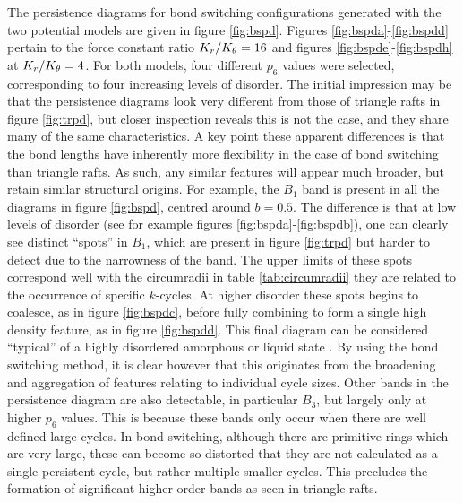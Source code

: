 The persistence diagrams for bond switching configurations generated with the two potential models are given in figure \ref{fig:bspd}.
Figures \ref{fig:bspda}\--\ref{fig:bspdd} pertain to the force constant ratio $K_r/K_\theta=16$ and figures \ref{fig:bspde}\--\ref{fig:bspdh} at $K_r/K_\theta=4$.
For both models, four different $p_6$ values were selected, corresponding to four increasing levels of disorder.
The initial impression may be that the persistence diagrams look very different from those of triangle rafts in figure \ref{fig:trpd}, but closer inspection reveals this is not the case, and they share many of the same characteristics.
A key point these apparent differences is that the bond lengths have inherently more flexibility in the case of bond switching than triangle rafts.
As such, any similar features will appear much broader, but retain similar structural origins.
For example, the $B_1$ band is present in all the diagrams in figure \ref{fig:bspd}, centred around $b=0.5$.
The difference is that at low levels of disorder  (see for example figures \ref{fig:bspda}\--\ref{fig:bspdb}), one can clearly see distinct ``spots'' in $B_1$, which are present in figure \ref{fig:trpd} but harder to detect due to the narrowness of the band.
The upper limits of these spots correspond well with the circumradii in table \ref{tab:circumradii} \ie{} they are related to the occurrence of specific $k$\--cycles.
At higher disorder these spots begins to coalesce, as in figure \ref{fig:bspdc}, before fully combining to form a single high density feature, as in figure \ref{fig:bspdd}.
This final diagram can be considered ``typical'' of a highly disordered amorphous or liquid state \cite{Hiraoka2016,Onodera2019}.
By using the bond switching method, it is clear however that this originates from the broadening and aggregation of features relating to individual cycle sizes.
Other bands in the persistence diagram are also detectable, in particular $B_3$, but largely only at higher $p_6$ values. 
This is because these bands only occur when there are well defined large cycles.
In bond switching, although there are primitive rings which are very large, these can become so distorted that they are not calculated as a single persistent cycle, but rather multiple smaller cycles.
This precludes the formation of significant higher order bands as seen in triangle rafts. 

